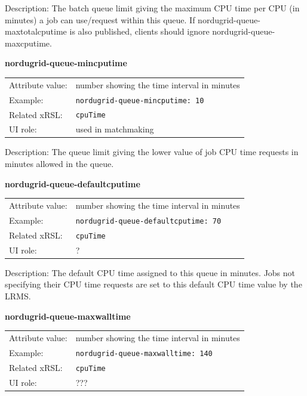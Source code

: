 \documentclass{article}
\begin{document}
Description: The batch queue limit giving the maximum CPU time per CPU (in
minutes) a job can use/request within this queue. If
nordugrid-queue-maxtotalcputime is also published, clients should ignore
nordugrid-queue-maxcputime.


  \hspace*{0.5cm}
  \begin{shaded}
    \textbf{nordugrid-queue-mincputime}
  \end{shaded}
  \begin{tabular}{lp{10cm}}  
    Attribute value:& number showing the time interval in minutes\\
    Example:& \verb#nordugrid-queue-mincputime: 10#\\
    Related xRSL:& \verb#cpuTime#\\
    UI role:& used in matchmaking\\ 
  \end{tabular}

Description: The queue limit giving the lower value of 
job CPU time requests in minutes allowed in the queue.


  \hspace*{0.5cm}
  \begin{shaded}
    \textbf{nordugrid-queue-defaultcputime}
  \end{shaded}
  \begin{tabular}{lp{10cm}}  
    Attribute value:& number showing the time interval in minutes\\
    Example:& \verb#nordugrid-queue-defaultcputime: 70#\\
    Related xRSL:& \verb#cpuTime#\\
    UI role:& ?\\
  \end{tabular}

Description: The default CPU time assigned to this queue in minutes.
Jobs not specifying their CPU time requests are set to this default
CPU time value by the LRMS.


  \hspace*{0.5cm}
  \begin{shaded}
    \textbf{nordugrid-queue-maxwalltime}
  \end{shaded}
  \begin{tabular}{lp{10cm}}  
    Attribute value:& number showing the time interval in minutes\\
    Example:& \verb#nordugrid-queue-maxwalltime: 140#\\
    Related xRSL:& \verb#cpuTime#\\
    UI role:& ???\\
  \end{tabular}
\end{document}
